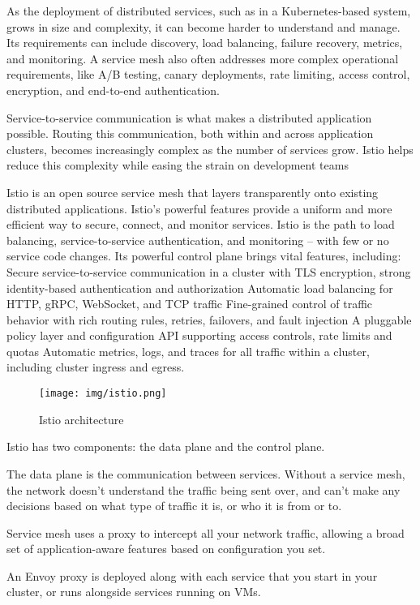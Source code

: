 \documentclass[12pt, draftclsnofoot, onecolumn]{IEEEtran}
\begin{document}
As the deployment of distributed services, such as in a Kubernetes-based system, grows in size and complexity, it can become harder to understand and manage. Its requirements can include discovery, load balancing, failure recovery, metrics, and monitoring. A service mesh also often addresses more complex operational requirements, like A/B testing, canary deployments, rate limiting, access control, encryption, and end-to-end authentication.

Service-to-service communication is what makes a distributed application possible. Routing this communication, both within and across application clusters, becomes increasingly complex as the number of services grow. Istio helps reduce this complexity while easing the strain on development teams

Istio is an open source service mesh that layers transparently onto existing distributed applications. Istio’s powerful features provide a uniform and more efficient way to secure, connect, and monitor services. Istio is the path to load balancing, service-to-service authentication, and monitoring – with few or no service code changes. Its powerful control plane brings vital features, including:  Secure service-to-service communication in a cluster with TLS encryption, strong identity-based authentication and authorization Automatic load balancing for HTTP, gRPC, WebSocket, and TCP traffic Fine-grained control of traffic behavior with rich routing rules, retries, failovers, and fault injection A pluggable policy layer and configuration API supporting access controls, rate limits and quotas Automatic metrics, logs, and traces for all traffic within a cluster, including cluster ingress and egress.
\begin{figure}[H]
	\centering
	\texttt{[image: img/istio.png]}
	\caption{Istio architecture}
\end{figure}
Istio has two components: the data plane and the control plane.

The data plane is the communication between services. Without a service mesh, the network doesn’t understand the traffic being sent over, and can’t make any decisions based on what type of traffic it is, or who it is from or to.

Service mesh uses a proxy to intercept all your network traffic, allowing a broad set of application-aware features based on configuration you set.

An Envoy proxy is deployed along with each service that you start in your cluster, or runs alongside services running on VMs.
\end{document}

